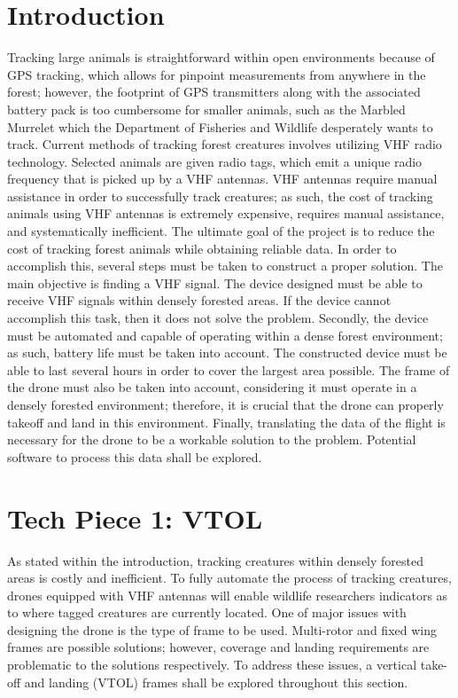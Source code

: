 \documentclass[onecolumn, draftclsnofoot,10pt, compsoc]{IEEEtran}
\begin{document}
\newpage
{}
\tableofcontents
\clearpage

\section{Introduction}
Tracking large animals is straightforward within open environments because of GPS tracking, which allows for pinpoint measurements from anywhere in the forest; however, the footprint of GPS transmitters along with the associated battery pack is too cumbersome for smaller animals, such as the Marbled Murrelet which the Department of Fisheries and Wildlife desperately wants to track. Current methods of tracking forest creatures involves utilizing VHF radio technology. Selected animals are given radio tags, which emit a unique radio frequency that is picked up by a VHF antennas. VHF antennas require manual assistance in order to successfully track creatures; as such, the cost of tracking animals using VHF antennas is extremely expensive, requires manual assistance, and systematically inefficient. The ultimate goal of the project is to reduce the cost of tracking forest animals while obtaining reliable data. In order to accomplish this, several steps must be taken to construct a proper solution. The main objective is finding a VHF signal. The device designed must be able to receive VHF signals within densely forested areas. If the device cannot accomplish this task, then it does not solve the problem. Secondly, the device must be automated and capable of operating within a dense forest environment; as such, battery life must be taken into account. The constructed device must be able to last several hours in order to cover the largest area possible. The frame of the drone must also be taken into account, considering it must operate in a densely forested environment; therefore, it is crucial that the drone can properly takeoff and land in this environment. Finally, translating the data of the flight is necessary for the drone to be a workable solution to the problem. Potential software to process this data shall be explored.

\section{Tech Piece 1: VTOL}
As stated within the introduction, tracking creatures within densely forested areas is costly and inefficient. To fully automate the process of tracking creatures, drones equipped with VHF antennas will enable wildlife researchers indicators as to where tagged creatures are currently located. One of major issues with designing the drone is the type of frame to be used. Multi-rotor and fixed wing frames are possible solutions; however, coverage and landing requirements are problematic to the solutions respectively. To address these issues, a vertical take-off and landing (VTOL) frames shall be explored throughout this section.
\end{document}
